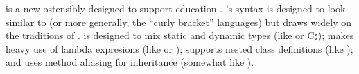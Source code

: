 
\Grace{} is a new \oopl{} ostensibly designed to support education . \Grace{}'s syntax is designed to look similar to \Java{} (or more generally, the ``curly bracket'' languages) but draws widely on the traditions of \oop{}. \Grace{} is designed to mix static and dynamic types (like \Strongtalk{} or C$\sharp$); makes heavy use of lambda expresions (like \Smalltalk{} or \Ruby{}); supports nested class definitions (like \BETA{}); and uses method aliasing for inheritance (somewhat like \Eiffel{}). 
